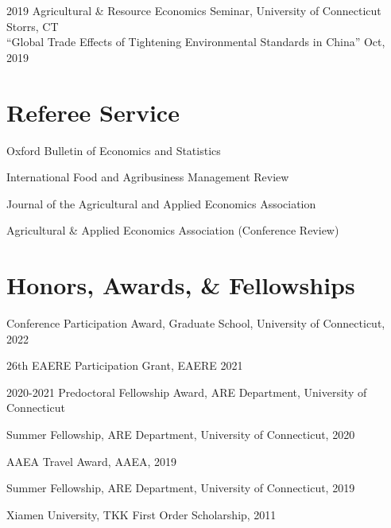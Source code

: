 \documentclass[10.5 pt,letterpaper]{article}
\renewenvironment{itemize}{
	\begin{list}{}{
			\setlength{\leftmargin}{1.5em}
		}
	}{
	\end{list}
}
\begin{document}
\begin{itemize}
		\item[-] 2019  Agricultural \& Resource Economics Seminar, University of Connecticut    \hfill  Storrs, CT\vspace{0.15cm} \\
				``Global Trade Effects of Tightening Environmental Standards in China''  \hfill Oct, 2019
	\end{itemize}	
	
	
	
	\section*{\textbf{Referee Service}}
	
	\begin{itemize}
		\item[-]  Oxford Bulletin of Economics and Statistics
		\item[-]  International Food and Agribusiness Management Review
		\item[-] Journal of the Agricultural and Applied Economics Association
		\item[-]  Agricultural \& Applied Economics Association (Conference Review)
	\end{itemize}
	
	\section*{\textbf{Honors, Awards, \& Fellowships}}
	
	\begin{itemize}
		\item[-] Conference Participation Award, Graduate School, University of Connecticut, 2022
		\item[-] 26th EAERE Participation Grant, EAERE 2021
		\item[-] 2020-2021 Predoctoral Fellowship Award, ARE Department, University of Connecticut
		\item[-]  Summer  Fellowship, ARE Department, University of Connecticut, 2020
		\item[-] AAEA Travel Award, AAEA, 2019
		\item[-]  Summer  Fellowship, ARE Department, University of Connecticut, 2019
		\item[-] Xiamen University, TKK First Order Scholarship, 2011
		
	\end{itemize}
	
	
\end{document}
